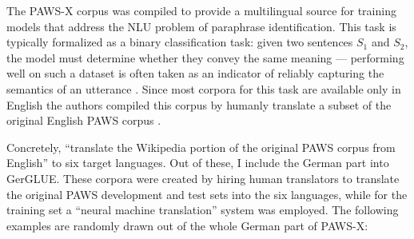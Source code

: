 The PAWS-X corpus \cite{yang2019paws} was compiled to provide a multilingual source for
training models that address the NLU problem of paraphrase identification. This task
is typically formalized as a binary classification task: given two sentences $S_1$ and
$S_2$, the model must determine whether they convey the same meaning --- performing well
on such a dataset is often taken as an indicator of reliably capturing the semantics
of an utterance \citep{mckeown1980paraphrasing}. Since most corpora for this task are
available only in English the authors compiled this corpus by humanly translate a subset
of the original English PAWS corpus \cite{zhang2019paws}.

Concretely, \citeauthor{yang2019paws} ``translate the Wikipedia portion of the original PAWS
corpus from English'' to six target languages. Out of these, I include the German part into
GerGLUE. These corpora were created by hiring human translators to translate the original
PAWS development and test sets into the six languages, while for the training set a ``neural
machine translation'' system was employed. The following examples are randomly drawn out of
the whole German part of PAWS-X:

